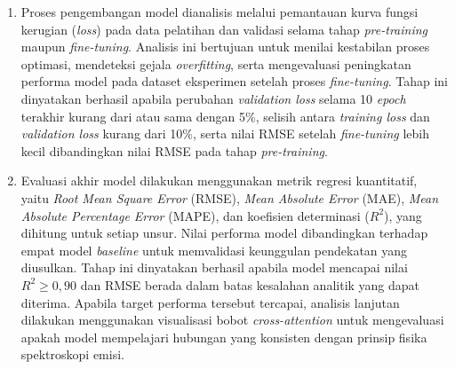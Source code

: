 \begin{enumerate}
    \item Proses pengembangan model dianalisis melalui pemantauan kurva fungsi kerugian (\textit{loss}) pada data pelatihan dan validasi selama tahap \textit{pre-training} maupun \textit{fine-tuning}. Analisis ini bertujuan untuk menilai kestabilan proses optimasi, mendeteksi gejala \textit{overfitting}, serta mengevaluasi peningkatan performa model pada dataset eksperimen setelah proses \textit{fine-tuning}. Tahap ini dinyatakan berhasil apabila perubahan \textit{validation loss} selama 10 \textit{epoch} terakhir kurang dari atau sama dengan 5\%, selisih antara \textit{training loss} dan \textit{validation loss} kurang dari 10\%, serta nilai RMSE setelah \textit{fine-tuning} lebih kecil dibandingkan nilai RMSE pada tahap \textit{pre-training}.

    \item Evaluasi akhir model dilakukan menggunakan metrik regresi kuantitatif, yaitu \textit{Root Mean Square Error} (RMSE), \textit{Mean Absolute Error} (MAE), \textit{Mean Absolute Percentage Error} (MAPE), dan koefisien determinasi ($R^2$), yang dihitung untuk setiap unsur. Nilai performa model dibandingkan terhadap empat model \textit{baseline} untuk memvalidasi keunggulan pendekatan yang diusulkan. Tahap ini dinyatakan berhasil apabila model mencapai nilai $R^2 \geq 0{,}90$ dan RMSE berada dalam batas kesalahan analitik yang dapat diterima. Apabila target performa tersebut tercapai, analisis lanjutan dilakukan menggunakan visualisasi bobot \textit{cross-attention} untuk mengevaluasi apakah model mempelajari hubungan yang konsisten dengan prinsip fisika spektroskopi emisi.
\end{enumerate}

